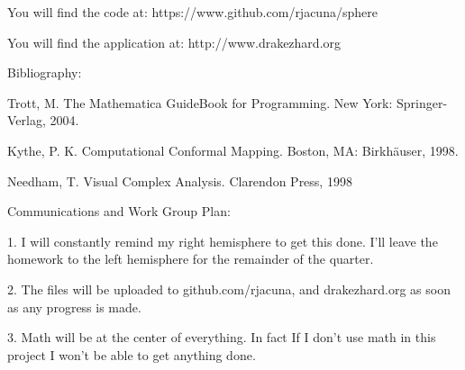 \documentclass{article}
\begin{document}
You will find the code at: https://www.github.com/rjacuna/sphere

You will find the application at: http://www.drakezhard.org

Bibliography:

Trott, M. The Mathematica GuideBook for Programming. New York:
Springer-Verlag, 2004.

Kythe, P. K. Computational Conformal Mapping. Boston, MA: Birkhäuser, 1998.

Needham, T. Visual Complex Analysis. Clarendon Press, 1998

Communications and Work Group Plan:

1. I will constantly remind my right
hemisphere to get this done. I'll leave the homework to the left
hemisphere for the remainder of the quarter.

2. The files will be uploaded to github.com/rjacuna, and
drakezhard.org as soon as any progress is made.

3. Math will be at the center of everything. In fact If I don't use
math in this project I won't be able to get anything done.
\end{document}
